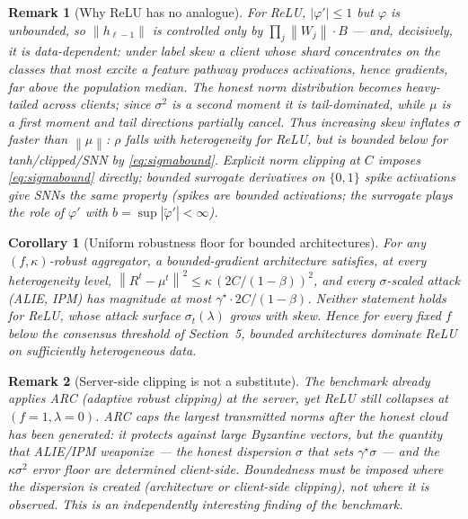 \documentclass[11pt]{article}
\newtheorem{corollary}{Corollary}
\newtheorem{remark}{Remark}
\newcommand{\norm}[1]{\left\lVert #1 \right\rVert}
\begin{document}
\begin{remark}[Why ReLU has no analogue]
For ReLU, $|\varphi'| \le 1$ but $\varphi$ is unbounded, so
$\norm{h_{\ell-1}}$ is controlled only by $\prod_j \norm{W_j}\cdot B$ ---
and, decisively, it is \emph{data-dependent}: under label skew a client whose
shard concentrates on the classes that most excite a feature pathway produces
activations, hence gradients, far above the population median. The honest norm
distribution becomes heavy-tailed across clients; since $\sigma^2$ is a second
moment it is tail-dominated, while $\mu$ is a first moment and tail directions
partially cancel. Thus increasing skew inflates $\sigma$ faster than
$\norm{\mu}$: $\rho$ falls with heterogeneity for ReLU, but is bounded below
for tanh/clipped/SNN by \eqref{eq:sigmabound}. Explicit norm clipping at $C$
imposes \eqref{eq:sigmabound} directly; bounded surrogate derivatives on
$\{0,1\}$ spike activations give SNNs the same property (spikes are bounded
activations; the surrogate plays the role of $\varphi'$ with
$b = \sup|\tilde\varphi'| < \infty$).
\end{remark}

\begin{corollary}[Uniform robustness floor for bounded architectures]
\label{cor:A}
For any $(f,\kappa)$-robust aggregator, a bounded-gradient architecture
satisfies, at every heterogeneity level,
$\norm{R^t - \mu^t}^2 \le \kappa\, (2C/(1-\beta))^2$,
and every $\sigma$-scaled attack (ALIE, IPM) has magnitude at most
$\gamma^\star \cdot 2C/(1-\beta)$. Neither statement holds for ReLU, whose
attack surface $\sigma_t(\lambda)$ grows with skew. Hence for every fixed $f$
below the consensus threshold of Section~5, bounded architectures dominate
ReLU on sufficiently heterogeneous data.
\end{corollary}

\begin{remark}[Server-side clipping is not a substitute]
The benchmark already applies ARC (adaptive robust clipping) at the server, yet
ReLU still collapses at $(f{=}1,\lambda{=}0)$. ARC caps the largest transmitted
norms \emph{after} the honest cloud has been generated: it protects against
large \emph{Byzantine} vectors, but the quantity that ALIE/IPM weaponize --- the
honest dispersion $\sigma$ that sets $\gamma^\star\sigma$ --- and the
$\kappa\sigma^2$ error floor are determined client-side. Boundedness must be
imposed where the dispersion is created (architecture or client-side clipping),
not where it is observed. This is an independently interesting finding of the
benchmark.
\end{remark}
\end{document}
